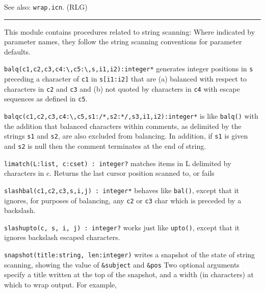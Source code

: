 See also: \texttt{wrap.icn}. (RLG)

\vspace{0.25cm}\hrule{}

This module contains procedures related to string
scanning: Where indicated by parameter names, they follow the string
scanning conventions for parameter defaults.

\texttt{balq(c1,c2,c3,c4:{\textquotesingle}{\textbackslash}{\textquotesingle}{\textquotedbl}{\textquotesingle},c5:{\textquotesingle}{\textbackslash}{\textquotesingle},s,i1,i2):integer*}
generates integer positions in \texttt{s} preceding a character of
\texttt{c1} in \texttt{s[i1:i2]} that are (a) balanced with respect to
characters in \texttt{c2} and \texttt{c3} and (b) not
{\textquotedbl}quoted{\textquotedbl} by characters in \texttt{c4} with
{\textquotedbl}escape{\textquotedbl} sequences as defined in
\texttt{c5}.

\texttt{balqc(c1,c2,c3,c4:{\textquotesingle}{\textbackslash}{\textquotesingle}{\textquotedbl}{\textquotesingle},c5,s1:{\textquotedbl}/*{\textquotedbl},s2:{\textquotedbl}*/{\textquotedbl},s3,i1,i2):integer*}
is like \texttt{balq()} with the addition that balanced characters
within {\textquotedbl}comments{\textquotedbl}, as delimited by the
strings \texttt{s1} and \texttt{s2}, are also excluded from balancing.
In addition, if \texttt{s1} is given and \texttt{s2} is null then the
comment terminates at the end of string.

\texttt{limatch(L:list, c:cset) : integer?} matches items in L delimited
by characters in c. Returns the last cursor position scanned to, or
fails 

\texttt{slashbal(c1,c2,c3,s,i,j) : integer*} behaves like
\texttt{bal()}, except that it ignores, for purposes of balancing, any
\texttt{c2} or \texttt{c3} char which is preceded by a backslash.

\texttt{slashupto(c, s, i, j) : integer?} works just like
\texttt{upto()}, except that it ignores backslash escaped characters.

\texttt{snapshot(title:string, len:integer)} writes a snapshot of the
state of string scanning, showing the value of \texttt{\&subject} and
\texttt{\&pos} Two optional arguments specify a title written at the
top of the snapshot, and a width (in characters) at which to wrap
output. For example,


